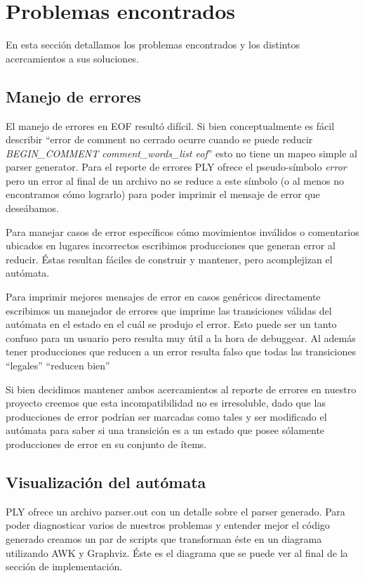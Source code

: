 \section{Problemas encontrados}
En esta sección detallamos los problemas encontrados y los distintos acercamientos a sus soluciones.

\subsection{Manejo de errores}
El manejo de errores en EOF resultó difícil. Si bien conceptualmente es fácil describir ``error de comment no cerrado ocurre cuando se puede reducir \textit{BEGIN\_COMMENT comment\_words\_list eof}'' esto no tiene un mapeo simple al parser generator. Para el reporte de errores PLY ofrece el pseudo-símbolo \textit{error} pero un error al final de un archivo no se reduce a este símbolo (o al menos no encontramos cómo lograrlo) para poder imprimir el mensaje de error que deseábamos.

Para manejar casos de error específicos cómo movimientos inválidos o comentarios ubicados en lugares incorrectos escribimos producciones que generan error al reducir. Éstas resultan fáciles de construir y mantener, pero acomplejizan el autómata.

Para imprimir mejores mensajes de error en casos genéricos directamente escribimos un manejador de errores que imprime las transiciones válidas del autómata en el estado en el cuál se produjo el error. Esto puede ser un tanto confuso para un usuario pero resulta muy útil a la hora de debuggear. Al además tener producciones que reducen a un error resulta falso que todas las transiciones ``legales'' ``reducen bien''

Si bien decidimos mantener ambos acercamientos al reporte de errores en nuestro proyecto creemos que esta incompatibilidad no es irresoluble, dado que las producciones de error podrían ser marcadas como tales y ser modificado el autómata para saber si una transición es a un estado que posee sólamente producciones de error en su conjunto de ítems.

\subsection{Visualización del autómata}
PLY ofrece un archivo parser.out con un detalle sobre el parser generado. Para poder diagnosticar varios de nuestros problemas y entender mejor el código generado creamos un par de scripts que transforman éste en un diagrama utilizando AWK y Graphviz. Éste es el diagrama que se puede ver al final de la sección de implementación.

